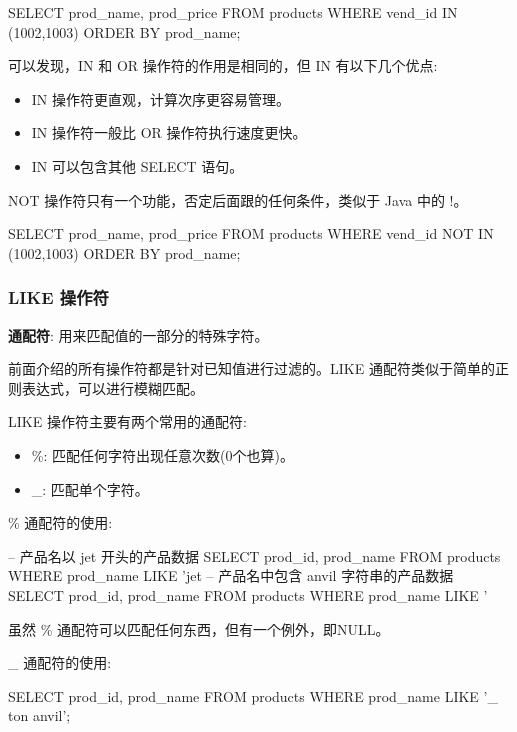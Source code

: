 \begin{sql}
SELECT prod_name, prod_price
    FROM products
    WHERE vend_id IN (1002,1003)
    ORDER BY prod_name;
\end{sql}

可以发现，IN 和 OR 操作符的作用是相同的，但 IN 有以下几个优点:
\begin{itemize}
    \item IN 操作符更直观，计算次序更容易管理。
    \item IN 操作符一般比 OR 操作符执行速度更快。
    \item IN 可以包含其他 SELECT 语句。
\end{itemize}

NOT 操作符只有一个功能，否定后面跟的任何条件，类似于 Java 中的 !。

\begin{sql}
SELECT prod_name, prod_price
    FROM products
    WHERE vend_id NOT IN (1002,1003)
    ORDER BY prod_name;
\end{sql}

\subsubsection{LIKE 操作符}

\textbf{通配符}: 用来匹配值的一部分的特殊字符。

前面介绍的所有操作符都是针对已知值进行过滤的。LIKE 通配符类似于简单的正则表达式，可以进行模糊匹配。

LIKE 操作符主要有两个常用的通配符:
\begin{itemize}
    \item \%: 匹配任何字符出现任意次数(0个也算)。
    \item \_: 匹配单个字符。
\end{itemize}

\% 通配符的使用:
\begin{sql}
-- 产品名以 jet 开头的产品数据
SELECT prod_id, prod_name
    FROM products
    WHERE prod_name LIKE 'jet%
-- 产品名中包含 anvil 字符串的产品数据
SELECT prod_id, prod_name
    FROM products
    WHERE prod_name LIKE '%
\end{sql}

虽然 \% 通配符可以匹配任何东西，但有一个例外，即NULL。

\_ 通配符的使用:

\begin{sql}
SELECT prod_id, prod_name
    FROM products
    WHERE prod_name LIKE '_ ton anvil';
\end{sql}

